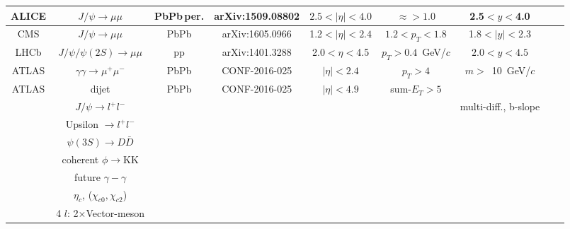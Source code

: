 \documentclass[../report.tex]{subfiles}
\begin{document}
\begin{table}[htbp]
{\begin{tabular}{|c|c|c|c|c|c|c|c|c|}
ALICE   &$J/\psi \to \mu\mu$         &PbPb\,per.& arXiv:1509.08802 &$2.5<|\eta|<4.0$& $\approx >1.0$       & 2.5$<y<$4.0             & &     \\
\hline
CMS          &$J/\psi \to \mu\mu$         & PbPb     & arXiv:1605.0966                  &1.2$<|\eta|<2.4$& $1.2<p_T<1.8$        & 1.8$<|y|<$2.3            & &     \\
\hline
LHCb         &$J/\psi/\psi(2S) \to \mu\mu$& pp       & arXiv:1401.3288
                                                                                                                          & 2.0$<\eta<$4.5  & $p_T>0.4$~GeV/$c$   & $2.0<y<4.5$    & &               \\
\hline
ATLAS       &$\gamma\gamma\to \mu^+\mu^-$ & PbPb   &CONF-2016-025
& $|\eta|<2.4$    & $p_T>4$             & $m>$~10~GeV/$c$   & &            \\
ATLAS       & dijet & PbPb   &CONF-2016-025
& $|\eta|<4.9$    & sum-$E_T>5$             &   &  & \\
\hline
& $J/\psi \to l^+l^-$                    &          &                                                                    &                  &                     & multi-diff., b-slope  & &          \\
& Upsilon $\to l^+l^-$                   &          &                                                                    &                  &                     &          & &                        \\
&$\psi(3S) \to D\bar{D}$                 &          &                                                                    &                  &                     &              & &                    \\
& coherent $\phi \to$KK             &          &                                                                    &                 &                      &       & &      \\
\hline
& future $\gamma-\gamma$                 &          &                                                                    &                 &                      &        & &   \\
\hline
&  $\eta_c$, ($\chi_{c0},\chi_{c2}$)    &          &                                                                    &                 &                      &         & &    \\
& 4 $l$: 2$\times$Vector-meson   &          &                                                                    &                 &                      &       & &      \\

\end{tabular}}
\end{table}
\end{document}
